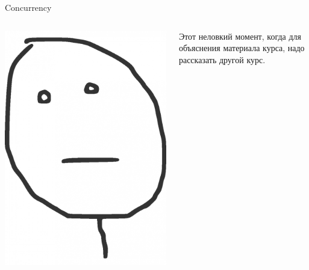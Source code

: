 \begin{frame}[fragile]{Concurrency}
    \begin{columns}[t] %
         \begin{column}[T]{5cm} %
            \begin{center}
              \includegraphics[width=\textwidth,keepaspectratio]{sources/images/etot-nelovkiy-moment_9027667_big_.png}
            \end{center}
         \end{column}
         \begin{column}[T]{5cm} %
            \begin{center}
            Этот неловкий момент, когда для объяснения материала курса, надо рассказать другой курс.
            \end{center}
         \end{column}
     \end{columns}
\end{frame}

